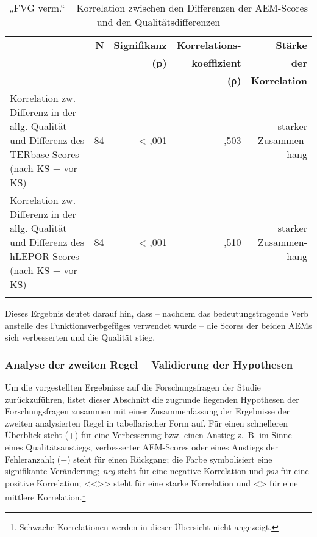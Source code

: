 \begin{table}
\begin{tabularx}{\textwidth}{Xrrrr}
\lsptoprule
& \textbf{N} & { \textbf{Signifikanz} } &\textbf{Korrelations-} & \textbf{Stärke}\\
& & \textbf{(p)} & \textbf{koeffizient} & \textbf{der}\\
&&& \textbf{(ρ)} &   \textbf{Korrelation}\\
\midrule
Korrelation zw. Differenz in der allg. Qualität und Differenz des TERbase-Scores (nach KS $-$ vor KS) & { 84} & < ,001 & ,503 & \makecell[tr]{starker\\Zusammen-\\hang}\\
\tablevspace
Korrelation zw. Differenz in der allg. Qualität und Differenz des hLEPOR-Scores (nach KS $-$ vor KS) & { 84} & < ,001 & ,510 & \makecell[tr]{starker\\Zusammen-\\hang}\\
\lspbottomrule
\end{tabularx}
\caption{\label{tab:05:38}„FVG verm.“ -- Korrelation zwischen den Differenzen der AEM-Scores und den Qualitätsdifferenzen}
\end{table}

Dieses Ergebnis deutet darauf hin, dass -- nachdem das bedeutungstragende Verb anstelle des Funktionsverbgefüges verwendet wurde -- die Scores der beiden AEMs sich verbesserten und die Qualität stieg.

\subsubsection{\label{sec:5.3.2.7}Analyse der zweiten Regel -- Validierung der Hypothesen}

Um die vorgestellten Ergebnisse auf die Forschungsfragen der Studie zurückzuführen, listet dieser Abschnitt die zugrunde liegenden Hypothesen der Forschungsfragen zusammen mit einer Zusammenfassung der Ergebnisse der zweiten analysierten Regel in tabellarischer Form auf. Für einen schnelleren Überblick steht (+) für eine Verbesserung bzw. einen Anstieg z.~B. im Sinne eines Qualitätsanstiegs, verbesserter AEM-Scores oder eines Anstiegs der Fehleranzahl; ($-$) steht für einen Rückgang; die  Farbe symbolisiert eine signifikante Veränderung; \textit{neg} steht für eine negative Korrelation und \textit{pos} für eine positive Korrelation; <{}<{}>{}> steht für eine starke Korrelation und <> für eine mittlere Korrelation.\footnote{\textrm{Schwache Korrelationen werden in dieser Übersicht nicht angezeigt.}}

